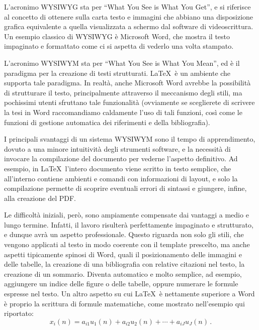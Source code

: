 \documentclass[12pt]{report}
\begin{document}
    L'acronimo WYSIWYG sta per ``What You See is What You Get'', e si riferisce al concetto di ottenere sulla carta testo e immagini che abbiano una disposizione grafica equivalente a quella visualizzata a schermo dal software di videoscrittura. Un esempio classico di WYSIWYG è Microsoft Word, che mostra il testo impaginato e formattato come ci si aspetta di vederlo una volta stampato.

    L'acronimo WYSIWYM sta per ``What You See is What You Mean'', ed è il paradigma per la creazione di testi strutturati. \LaTeX\ è un ambiente che supporta tale paradigma. In realtà, anche Microsoft Word avrebbe la possibilità di strutturare il testo, principalmente attraverso il meccanismo degli stili, ma pochissimi utenti sfruttano tale funzionalità (ovviamente se sceglierete di scrivere la tesi in Word raccomandiamo caldamente l'uso di tali funzioni, così come le funzioni di gestione automatica dei riferimenti e della bibliografia).

    I principali svantaggi di un sistema WYSIWYM sono il tempo di apprendimento, dovuto a una minore intuitività degli strumenti software, e la necessità di invocare la compilazione del documento per vederne l'aspetto definitivo. Ad esempio, in \LaTeX\ l'intero documento viene scritto in testo semplice, che all'interno contiene ambienti e comandi con informazioni di layout, e solo la compilazione permette di scoprire eventuali errori di sintassi e giungere, infine, alla creazione del PDF.

    Le difficoltà iniziali, però, sono ampiamente compensate dai vantaggi a medio e lungo termine. Infatti, il lavoro risulterà perfettamente impaginato e strutturato, e dunque avrà un aspetto professionale. Questo riguarda non solo gli stili, che vengono applicati al testo in modo coerente con il template prescelto, ma anche aspetti tipicamente spinosi di Word, quali il posizionamento delle immagini e delle tabelle, la creazione di una bibliografia con relative citazioni nel testo, la creazione di un sommario. Diventa automatico e molto semplice, ad esempio, aggiungere un indice delle figure o delle tabelle, oppure numerare le formule espresse nel testo. Un altro aspetto su cui \LaTeX\ è nettamente superiore a Word è proprio la scrittura di formule matematiche, come mostrato nell'esempio qui riportato:
    \begin{equation}
        x_i(n) = a_{i1}u_1(n) + a_{i2}u_2(n) + \cdots + a_{iJ}u_J(n) \, .
        \label{eq:multimix}
    \end{equation}
\end{document}
